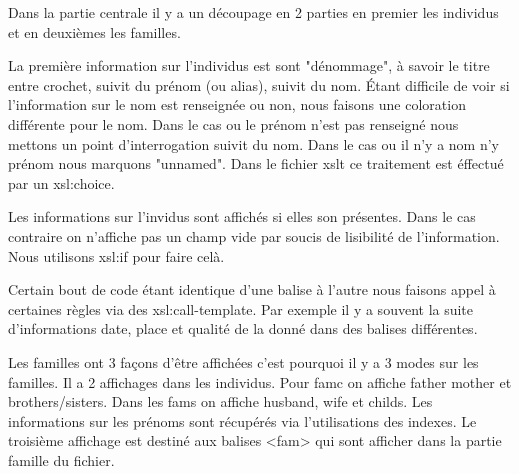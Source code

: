 \documentclass[12pt,a4paper]{report}
\begin{document}
Dans la partie centrale il y a un découpage en 2 parties en premier les
individus et en deuxièmes les familles.

La première information sur l'individus est sont "dénommage", à savoir le titre
entre crochet, suivit du prénom (ou alias), suivit du nom.
Étant difficile de voir si l'information sur le nom est renseignée ou non, nous
faisons une coloration différente pour le nom. Dans le cas ou le prénom n'est
pas renseigné nous mettons un point d'interrogation suivit du nom. Dans le cas
ou il n'y a nom n'y prénom nous marquons "unnamed". Dans le fichier xslt ce
traitement est éffectué par un xsl:choice.

Les informations sur l'invidus sont affichés si elles son présentes. Dans le
cas contraire on n'affiche pas un champ vide par soucis de lisibilité de
l'information. Nous utilisons xsl:if pour faire celà.

Certain bout de code étant identique d'une balise à l'autre nous faisons
appel à certaines règles via des xsl:call-template. Par exemple il y a souvent
la suite d'informations date, place et qualité de la donné dans des balises
différentes.

Les familles ont 3 façons d'être affichées c'est pourquoi il y a 3 modes sur
les familles. Il a 2 affichages dans les individus. Pour famc on affiche father
mother et brothers/sisters. Dans les fams on affiche husband, wife et childs.
Les informations sur les prénoms sont récupérés via l'utilisations des indexes.
Le troisième affichage est destiné aux balises <fam> qui sont afficher dans la
partie famille du fichier.
\end{document}
